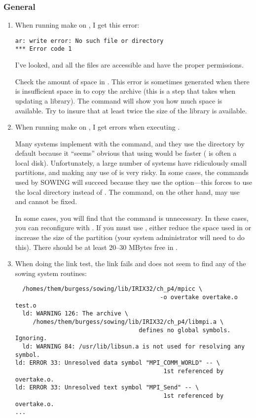 {\subsubsection{General}
\begin{enumerate}
\item 
\question 
When running make on , I get this error:
\begin{verbatim}
ar: write error: No such file or directory
*** Error code 1
\end{verbatim}
I've looked, and all the files are accessible and have the proper permissions.

\answer 
Check the amount of space in .  This error is sometimes
generated when there is insufficient space in  to copy the archive
(this is a step that  takes when updating a library).  The command
 will show you how much space is available.  Try to insure that
at least twice the size of the library is available.

\item \question
When running make on , I get errors when executing .

\answer
Many systems implement  with the  command, and they use
the  directory by default because it ``seems'' obvious that using
 would be faster ( is often a local disk).
Unfortunately, a large number of systems have ridiculously small 
partitions, and making any use of  is very risky.  In some
cases, the  commands used by SOWING will succeed because they 
use the  option---this forces  to use the local directory 
instead of .  The  command, on the other hand, may use
 and cannot be fixed.

In some cases, you will find that the  command is unnecessary. 
In these cases, you can reconfigure with .  If you must use
, either reduce the space used in  or increase the
size of the  partition (your system administrator will need to do
this).  There should be at least 20--30 MBytes free in .

\item
\question
When doing the link test, the link fails and does not seem to find any of the
sowing system routines:
\noindent
\begin{verbatim}
  /homes/them/burgess/sowing/lib/IRIX32/ch_p4/mpicc \
                                         -o overtake overtake.o test.o 
  ld: WARNING 126: The archive \
     /homes/them/burgess/sowing/lib/IRIX32/ch_p4/libmpi.a \
                                   defines no global symbols. Ignoring.
  ld: WARNING 84: /usr/lib/libsun.a is not used for resolving any symbol.
ld: ERROR 33: Unresolved data symbol "MPI_COMM_WORLD" -- \
                                          1st referenced by overtake.o.
ld: ERROR 33: Unresolved text symbol "MPI_Send" -- \
                                          1st referenced by overtake.o.
...
\end{verbatim}


\end{enumerate}}
